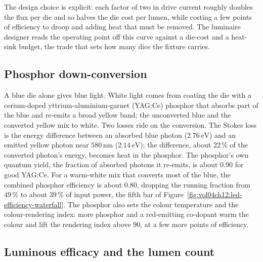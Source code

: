 

The design choice is explicit: each factor of two in drive current
roughly doubles the flux per die and so halves the die cost per lumen,
while costing a few points of efficiency to droop and adding heat that
must be removed. The luminaire designer reads the operating point off
this curve against a die-cost and a heat-sink budget, the trade that
sets how many dice the fixture carries.

\subsection{Phosphor down-conversion}

A blue die alone gives blue light. White light comes from coating the die
with a cerium-doped yttrium-aluminium-garnet (YAG:Ce) phosphor that
absorbs part of the blue and re-emits a broad yellow band; the unconverted
blue and the converted yellow mix to white. Two losses ride on the
conversion. The Stokes loss is the energy difference between an absorbed
blue photon ($2.76\,\si{\electronvolt}$) and an emitted yellow photon near
$580\,\si{\nano\meter}$ ($2.14\,\si{\electronvolt}$); the difference,
about $22\,\%$ of the converted photon's energy, becomes heat in the
phosphor. The phosphor's own quantum yield, the fraction of absorbed
photons it re-emits, is about $0.90$ for good YAG:Ce. For a warm-white
mix that converts most of the blue, the combined phosphor efficiency is
about $0.80$, dropping the running fraction from $49\,\%$ to about
$39\,\%$ of input power, the fifth bar of
Figure~\ref{fig:vol04ch12:led-efficiency-waterfall}. The phosphor also
sets the colour temperature and the colour-rendering index: more phosphor
and a red-emitting co-dopant warm the colour and lift the rendering index
above $90$, at a few more points of efficiency.

\subsection{Luminous efficacy and the lumen count}

